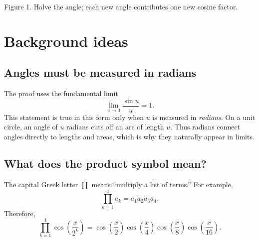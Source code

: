 \documentclass[11pt]{article}
\begin{document}
\begin{center}

\small Figure 1. Halve the angle; each new angle contributes one new cosine factor.
\end{center}

\section{Background ideas}

\subsection{Angles must be measured in radians}

The proof uses the fundamental limit
\[
  \lim_{u\to 0}\frac{\sin u}{u}=1.
\]
This statement is true in this form only when \(u\) is measured in \emph{radians}.
On a unit circle, an angle of \(u\) radians cuts off an arc of length \(u\). Thus radians connect angles directly to lengths and areas, which is why they naturally appear in limits.

\subsection{What does the product symbol mean?}

The capital Greek letter \(\prod\) means ``multiply a list of terms.'' For example,
\[
  \prod_{k=1}^{4} a_k=a_1a_2a_3a_4.
\]
Therefore,
\[
  \prod_{k=1}^{4}\cos\!\left(\frac{x}{2^k}\right)
  =\cos\!\left(\frac{x}{2}\right)
   \cos\!\left(\frac{x}{4}\right)
   \cos\!\left(\frac{x}{8}\right)
   \cos\!\left(\frac{x}{16}\right).
\]
\end{document}
